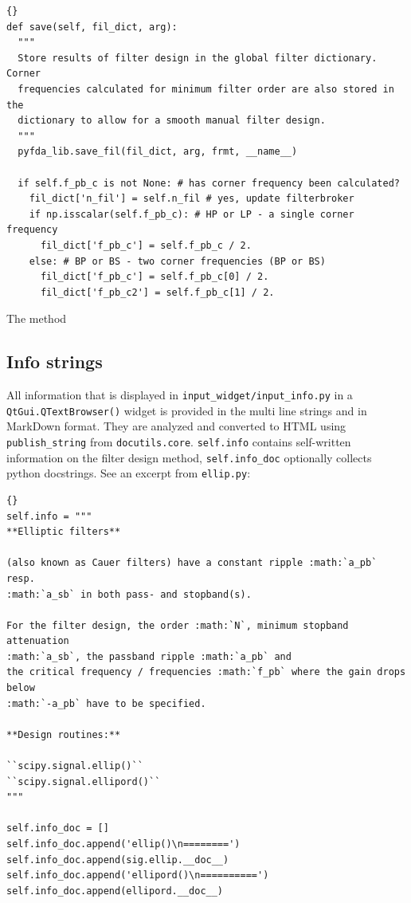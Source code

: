\documentclass[paper=a4, pagesize, twoside, draft=false,
BCOR7mm, DIV13, fontsize=11pt, headings=normal, footinclude=false, 
toc=listof, english, parskip=half]{scrartcl} %
\begin{document}
\begin{lstlisting}[style = pyStyle]{}
def save(self, fil_dict, arg):
  """
  Store results of filter design in the global filter dictionary. Corner
  frequencies calculated for minimum filter order are also stored in the 
  dictionary to allow for a smooth manual filter design.
  """
  pyfda_lib.save_fil(fil_dict, arg, frmt, __name__)

  if self.f_pb_c is not None: # has corner frequency been calculated?
    fil_dict['n_fil'] = self.n_fil # yes, update filterbroker
    if np.isscalar(self.f_pb_c): # HP or LP - a single corner frequency
      fil_dict['f_pb_c'] = self.f_pb_c / 2.
    else: # BP or BS - two corner frequencies (BP or BS)
      fil_dict['f_pb_c'] = self.f_pb_c[0] / 2.
      fil_dict['f_pb_c2'] = self.f_pb_c[1] / 2.
\end{lstlisting}

The method

\subsection{Info strings}
All information that is displayed in \texttt{input\_widget/input\_info.py} in a \texttt{QtGui.QTextBrowser()} widget is provided in the multi line strings  and  in MarkDown format. They are analyzed and converted to HTML using \texttt{publish\_string} from \texttt{docutils.core}. \texttt{self.info} contains self-written information on the filter design method, \texttt{self.info\_doc} optionally collects python docstrings. See an excerpt from \texttt{ellip.py}:
 
\begin{lstlisting}[style=pyStyle]{}
self.info = """
**Elliptic filters**

(also known as Cauer filters) have a constant ripple :math:`a_pb` resp.
:math:`a_sb` in both pass- and stopband(s).

For the filter design, the order :math:`N`, minimum stopband attenuation
:math:`a_sb`, the passband ripple :math:`a_pb` and
the critical frequency / frequencies :math:`f_pb` where the gain drops below
:math:`-a_pb` have to be specified.

**Design routines:**

``scipy.signal.ellip()``
``scipy.signal.ellipord()``
"""

self.info_doc = []
self.info_doc.append('ellip()\n========')
self.info_doc.append(sig.ellip.__doc__)
self.info_doc.append('ellipord()\n==========')
self.info_doc.append(ellipord.__doc__)
\end{lstlisting}
\end{document}
